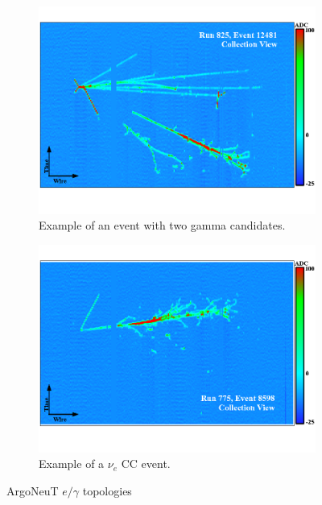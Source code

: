 \begin{figure}[htp!]
\centering
	\begin{subfigure}[t]{.475\textwidth}
	\includegraphics[width=\textwidth]{figs/gamma.png}
	\caption{Example of an event with two gamma candidates.}
	\label{fig:gamma}
	\end{subfigure}
	\begin{subfigure}[t]{.475\textwidth}
	\includegraphics[width=\textwidth]{figs/electron.png}
	\caption{Example of a $\nu_e$ CC event.}
	\label{fig:electron}
	\end{subfigure}
\caption{ArgoNeuT $e/\gamma$ topologies \cite{argoneut5}}
\label{fig:egamma}
\end{figure}


